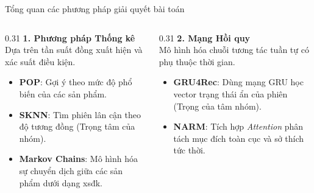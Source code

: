 \documentclass[aspectratio=169, 11pt]{beamer}
\begin{document}
\begin{frame}{Tổng quan các phương pháp giải quyết bài toán}
\vspace{0.5cm}
    \begin{columns}[t]
        \begin{column}{0.31\textwidth}
            \small
            \textbf{1. Phương pháp Thống kê}\\
            \vspace{0.5cm}
            \footnotesize
            Dựa trên tần suất đồng xuất hiện và xác suất điều kiện.\\
            \vspace{0.25cm}
            \begin{itemize}
                \item \textbf{POP}: Gợi ý theo mức độ phổ biến của các sản phẩm.
                \item \textbf{SKNN}: Tìm phiên lân cận theo độ tương đồng (Trọng tâm của nhóm).
                \item \textbf{Markov Chains}: Mô hình hóa sự chuyển dịch giữa các sản phẩm dưới dạng xsđk.
            \end{itemize}
        \end{column}

        \begin{column}{0.31\textwidth}
            \small
            \textbf{2. Mạng Hồi quy}\\
            \vspace{0.5cm}
            \footnotesize
            Mô hình hóa chuỗi tương tác tuần tự có phụ thuộc thời gian.\\
            \vspace{0.25cm}
            \begin{itemize}
                \item \textbf{GRU4Rec}: Dùng mạng GRU học vector trạng thái ẩn của phiên (Trọng của tâm nhóm).
                \item \textbf{NARM}: Tích hợp \textit{Attention} phân tách mục đích toàn cục và sở thích tức thời.
            \end{itemize}
        \end{column}


\end{columns}
\end{frame}
\end{document}
